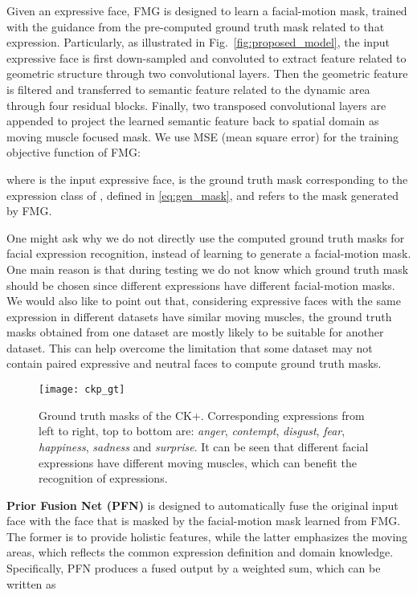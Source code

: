 \documentclass[conference,a4paper]{IEEEtran}
\begin{document}
Given an expressive face, FMG is designed to learn a facial-motion mask, trained with the guidance from the pre-computed ground truth mask related to that expression. Particularly, as illustrated in Fig.~\ref{fig:proposed_model}, the input expressive face is first down-sampled and convoluted to extract feature related to geometric structure through two convolutional layers. Then the geometric feature is filtered and transferred to semantic feature related to the dynamic area through four residual blocks. Finally, two transposed convolutional layers are appended to project the learned semantic feature back to spatial domain as moving muscle focused mask. We use MSE (mean square error) for the training objective function of FMG: 

where  is the input expressive face,  is the ground truth mask corresponding to the expression class of , defined in \eqref{eq:gen_mask}, and  refers to the mask generated by FMG. 

One might ask why we do not directly use the computed ground truth masks for facial expression recognition, instead of learning to generate a facial-motion mask. One main reason is that during testing we do not know which ground truth mask should be chosen since different expressions have different facial-motion masks. We would also like to point out that, considering expressive faces with the same expression in different datasets have similar moving muscles, the ground truth masks obtained from one dataset are mostly likely to be suitable for another dataset. This can help overcome the limitation that some dataset may not contain paired expressive and neutral faces to compute ground truth masks.



\begin{figure}[t!]
    \centering
    \texttt{[image: ckp\_gt]}
    \caption{Ground truth masks of the CK+. Corresponding expressions from left to right, top to bottom are: \textit{anger}, \textit{contempt}, \textit{disgust}, \textit{fear}, \textit{happiness}, \textit{sadness} and \textit{surprise}. It can be seen that different facial expressions have different moving muscles, which can benefit the recognition of expressions.}\label{fig:ckp_gt}
\end{figure}

\textbf{Prior Fusion Net (PFN)} is designed to automatically fuse the original input face with the face that is masked by the facial-motion mask learned from FMG. The former is to provide holistic features, while the latter emphasizes the moving areas, which reflects the common expression definition and domain knowledge. Specifically, PFN produces a fused output  by a weighted sum, which can be written as 
\end{document}
